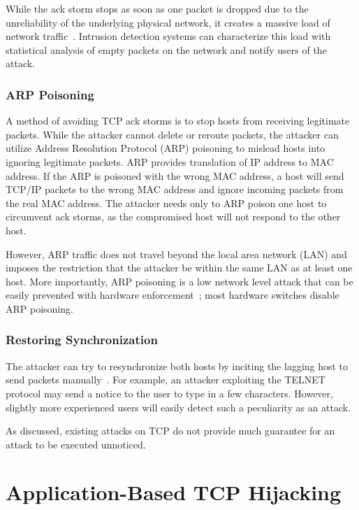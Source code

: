 \documentclass{sig-alternate}
\begin{document}
While the ack storm stops as soon as one packet is dropped due to the unreliability of the underlying physical network, it creates a massive load of network traffic~\cite{joncheray:simpleattack}.
Intrusion detection systems can characterize this load with statistical analysis of empty packets on the network and notify users of the attack.

\subsubsection{ARP Poisoning}

A method of avoiding TCP ack storms is to stop hosts from receiving legitimate packets.
While the attacker cannot delete or reroute packets, the attacker can utilize Address Resolution Protocol (ARP) poisoning to mislead hosts into ignoring legitimate packets.
ARP provides translation of IP address to MAC address.
If the ARP is poisoned with the wrong MAC address, a host will send TCP/IP packets to the wrong MAC address and ignore incoming packets from the real MAC address.
The attacker needs only to ARP poison one host to circumvent ack storms, as the compromised host will not respond to the other host.

However, ARP traffic does not travel beyond the local area network (LAN) and imposes the restriction that the attacker be within the same LAN as at least one host.
More importantly, ARP poisoning is a low network level attack that can be easily prevented with hardware enforcement~\cite{spangler:sniffing}; most hardware switches disable ARP poisoning.

\subsubsection{Restoring Synchronization}

The attacker can try to resynchronize both hosts by inciting the lagging host to send packets manually~\cite{lam:resync}.
For example, an attacker exploiting the TELNET protocol may send a notice to the user to type in a few characters.
However, slightly more experienced users will easily detect such a peculiarity as an attack.

As discussed, existing attacks on TCP do not provide much guarantee for an attack to be executed unnoticed.

\section{Application-Based TCP Hijacking}
\end{document}
